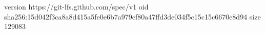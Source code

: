 version https://git-lfs.github.com/spec/v1
oid sha256:15d042f3ca8a8d415a5fe0e6b7a979cf80a47ffd3de034f5c15c15c6670e8d94
size 129083
